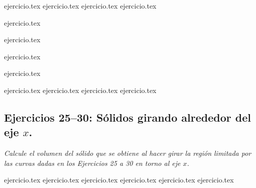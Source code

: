 \begin{center}
\end{center}

\begin{enumerate}
    \setcounter{enumi}{12}
    \begin{minipage}{0.3\textwidth}
    {ejercicio.tex}
    {ejercicio.tex}
    {ejercicio.tex}
    {ejercicio.tex}
    \end{minipage}%
    \begin{minipage}{0.3\textwidth}
    \setcounter{enumi}{13}
    {ejercicio.tex}
    \addtocounter{enumi}{1}
    {ejercicio.tex}
    \addtocounter{enumi}{1}
    {ejercicio.tex}
    \addtocounter{enumi}{1}
    {ejercicio.tex}
    \end{minipage}%
    \begin{minipage}{0.3\textwidth}
    \setcounter{enumi}{20}
    {ejercicio.tex}
    {ejercicio.tex}
    {ejercicio.tex}
    {ejercicio.tex}
    \end{minipage}
\end{enumerate}

\subsection*{Ejercicios 25--30: Sólidos girando alrededor del eje $x$.}

\noindent \textit{Calcule el volumen del sólido que se obtiene al hacer girar la región limitada por las curvas dadas en los Ejercicios 25 a 30 en torno al eje $x$.}

\begin{enumerate}
    \setcounter{enumi}{24}
    {ejercicio.tex}
    {ejercicio.tex}
    {ejercicio.tex}
    {ejercicio.tex}
    {ejercicio.tex}
    {ejercicio.tex}
\end{enumerate}

